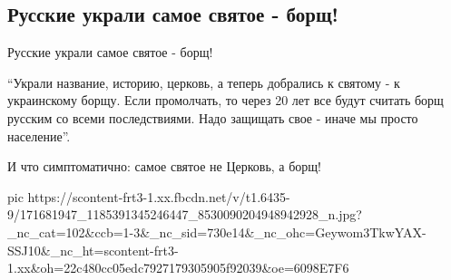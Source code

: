  
 
 
 
 
\subsection{Русские украли самое святое - борщ!}
\label{sec:11_04_2021.fb.berdnik_miroslava.4.borsch_svjatoje_cerkva_rossia}

Русские украли самое святое - борщ! 

\enquote{Украли название, историю, церковь, а теперь добрались к святому - к
украинскому борщу. Если промолчать, то через 20 лет все будут считать борщ
русским со всеми последствиями.  Надо защищать свое - иначе мы просто
население}.

И что симптоматично: самое святое не Церковь, а борщ!


\ifcmt
  pic https://scontent-frt3-1.xx.fbcdn.net/v/t1.6435-9/171681947_1185391345246447_8530090204948942928_n.jpg?_nc_cat=102&ccb=1-3&_nc_sid=730e14&_nc_ohc=Geywom3TkwYAX-SSJ10&_nc_ht=scontent-frt3-1.xx&oh=22c480cc05edc7927179305905f92039&oe=6098E7F6
\fi


